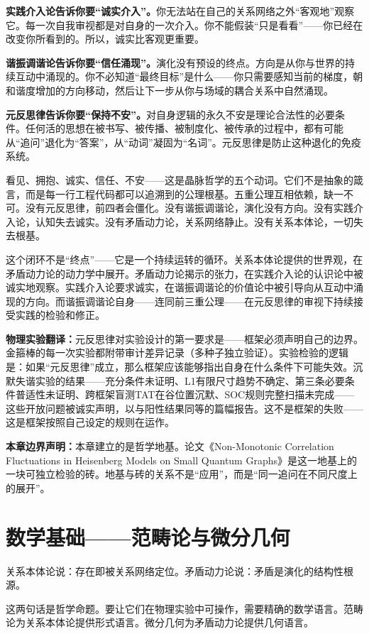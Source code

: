 \documentclass[11pt,a4paper]{book}
\theoremstyle{definition}
\begin{document}
\textbf{实践介入论告诉你要“诚实介入”。}你无法站在自己的关系网络之外“客观地”观察它。每一次自我审视都是对自身的一次介入。你不能假装“只是看看”——你已经在改变你所看到的。所以，诚实比客观更重要。

\textbf{谐振调谐论告诉你要“信任涌现”。}演化没有预设的终点。方向是从你与世界的持续互动中涌现的。你不必知道“最终目标”是什么——你只需要感知当前的梯度，朝和谐度增加的方向移动，然后让下一步从你与场域的耦合关系中自然涌现。

\textbf{元反思律告诉你要“保持不安”。}对自身逻辑的永久不安是理论合法性的必要条件。任何活的思想在被书写、被传播、被制度化、被传承的过程中，都有可能从“追问”退化为“答案”，从“动词”凝固为“名词”。元反思律是防止这种退化的免疫系统。

看见、拥抱、诚实、信任、不安——这是晶脉哲学的五个动词。它们不是抽象的箴言，而是每一行工程代码都可以追溯到的公理根基。五重公理互相依赖，缺一不可。没有元反思律，前四者会僵化。没有谐振调谐论，演化没有方向。没有实践介入论，认知失去诚实。没有矛盾动力论，关系网络静止。没有关系本体论，一切失去根基。

这个闭环不是“终点”——它是一个持续运转的循环。关系本体论提供的世界观，在矛盾动力论的动力学中展开。矛盾动力论揭示的张力，在实践介入论的认识论中被诚实地观察。实践介入论要求诚实，在谐振调谐论的价值论中被引导向从互动中涌现的方向。而谐振调谐论自身——连同前三重公理——在元反思律的审视下持续接受实践的检验和修正。

\textbf{物理实验翻译：}元反思律对实验设计的第一要求是——框架必须声明自己的边界。金箍棒的每一次实验都附带审计差异记录（多种子独立验证）。实验检验的逻辑是：如果“元反思律”成立，那么框架应该能够指出自身在什么条件下可能失效。沉默失谐实验的结果——充分条件未证明、L1有限尺寸趋势不确定、第三条必要条件普适性未证明、跨框架盲测TAT在谷位置沉默、SOC规则完整扫描未完成——这些开放问题被诚实声明，以与阳性结果同等的篇幅报告。这不是框架的失败——这是框架按照自己设定的规则在运作。

\textbf{本章边界声明：}本章建立的是哲学地基。论文《Non-Monotonic Correlation Fluctuations in Heisenberg Models on Small Quantum Graphs》是这一地基上的一块可独立检验的砖。地基与砖的关系不是“应用”，而是“同一追问在不同尺度上的展开”。

\chapter{数学基础——范畴论与微分几何}

关系本体论说：存在即被关系网络定位。矛盾动力论说：矛盾是演化的结构性根源。

这两句话是哲学命题。要让它们在物理实验中可操作，需要精确的数学语言。范畴论为关系本体论提供形式语言。微分几何为矛盾动力论提供几何语言。
\end{document}

